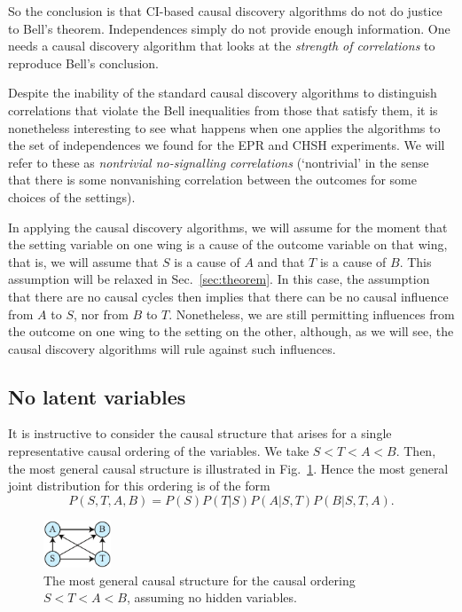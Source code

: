 \documentclass[letterpaper,onecolumn,nofootinbib]{revtex4}
\begin{document}
So the conclusion is that CI-based causal discovery algorithms do not  do justice to Bell's theorem.
Independences simply do not provide enough information. One needs a causal
discovery algorithm that looks at the {\em strength of correlations} to reproduce Bell's conclusion.

Despite the inability of the standard causal discovery algorithms to
distinguish correlations that violate the Bell inequalities from those that
satisfy them, it is nonetheless interesting to see what happens when one
applies the algorithms to the set of independences we found for the EPR and
CHSH experiments. We will refer to these as \emph{nontrivial no-signalling
correlations} (`nontrivial' in the sense that there is some nonvanishing correlation between the outcomes
for some choices of the settings).

In applying the causal discovery algorithms, we will assume for the moment that the setting variable on one wing is a cause of the outcome variable on that wing, that is, we will assume that $S$ is a cause of $A$ and that $T$ is a cause of $B$.  This assumption will be relaxed in Sec.~\ref{sec:theorem}.
In this case, the assumption that there are no causal cycles then implies that there can be no causal influence from $A$ to $S$, nor from $B$ to $T$. Nonetheless, we are still permitting influences from the outcome on one wing to the setting on the other, although, as we will see, the causal discovery algorithms will rule against such influences.


\subsection{No latent variables}
\label{sec:qcor-nohvar}

It is instructive to consider the causal structure that arises for a single representative
causal ordering of the variables. We take $S<T<A<B.$ Then, the most general
causal structure is illustrated in Fig.~\ref{fig:bell-gen}. Hence the most general joint
distribution for this ordering is of the form
\begin{equation*}
P(S,T,A,B)=P(S)P(T|S)P(A|S,T)P(B|S,T,A).
\end{equation*}%

\begin{figure}[h]
	\centering
	\includegraphics[width=0.18\textwidth]{bell-gen}
 \caption{The most general causal structure for the causal ordering $S<T<A<B$, assuming no hidden variables.}
       \label{fig:bell-gen}
\end{figure}
\end{document}
